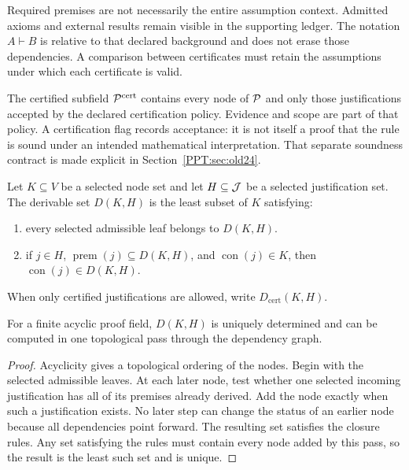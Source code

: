 Required premises are not necessarily the entire assumption context. Admitted axioms and external results remain visible in the supporting ledger. The notation $A\vdash B$ is relative to that declared background and does not erase those dependencies. A comparison between certificates must retain the assumptions under which each certificate is valid.

\begin{PPTdefinition}
\label{PPT:res:3:3}
The certified subfield $\mathcal P^{\mathrm{cert}}$ contains every node of $\mathcal P$ and only those justifications accepted by the declared certification policy. Evidence and scope are part of that policy. A certification flag records acceptance: it is not itself a proof that the rule is sound under an intended mathematical interpretation. That separate soundness contract is made explicit in Section~\ref{PPT:sec:old24}.
\end{PPTdefinition}

\begin{PPTdefinition}[Derivability]
\label{PPT:res:3:4}
Let $K\subseteq V$ be a selected node set and let $H\subseteq\mathcal J$ be a selected justification set. The derivable set $D(K,H)$ is the least subset of $K$ satisfying:
\begin{enumerate}[label=\textup{(\roman*)}]
\item every selected admissible leaf belongs to $D(K,H)$.
\item if $j\in H$, $\operatorname{prem}(j)\subseteq D(K,H)$, and $\operatorname{con}(j)\in K$, then $\operatorname{con}(j)\in D(K,H)$.
\end{enumerate}
When only certified justifications are allowed, write $D_{\mathrm{cert}}(K,H)$.
\end{PPTdefinition}

\begin{PPTproposition}
\label{PPT:res:3:5}
For a finite acyclic proof field, $D(K,H)$ is uniquely determined and can be computed in one topological pass through the dependency graph.
\end{PPTproposition}

\begin{proof}
Acyclicity gives a topological ordering of the nodes. Begin with the selected admissible leaves. At each later node, test whether one selected incoming justification has all of its premises already derived. Add the node exactly when such a justification exists. No later step can change the status of an earlier node because all dependencies point forward. The resulting set satisfies the closure rules. Any set satisfying the rules must contain every node added by this pass, so the result is the least such set and is unique.
\end{proof}

